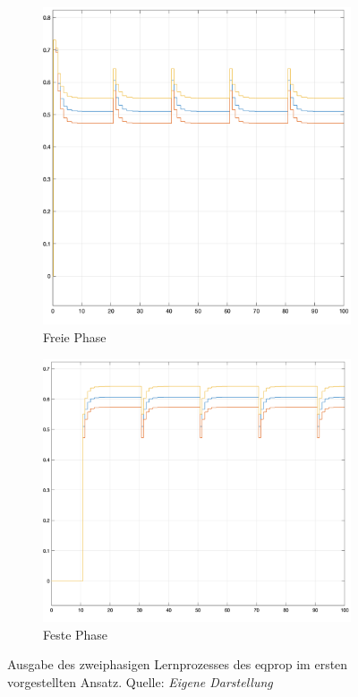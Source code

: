 \begin{figure}[h]
  \centering
  \begin{subfigure}[b]{0.5\textwidth}
    \includegraphics[width=\textwidth]{abbildungen/eqprop_discrete_free_output.png}
    \caption{Freie Phase}
  \end{subfigure}%
  \hfill
  \begin{subfigure}[b]{0.5\textwidth}
    \includegraphics[width=\textwidth]{abbildungen/eqprop_discrete_clamped_output.png}
    \caption{Feste Phase}
  \end{subfigure}
  \caption{Ausgabe des zweiphasigen Lernprozesses des \gls{eqprop} im ersten vorgestellten Ansatz. Quelle: \textit{Eigene Darstellung}}
  \label{fig:Output EqProp 1}
\end{figure}

